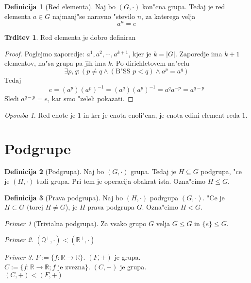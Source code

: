 \documentclass{article}
\theoremstyle{definition}
\newtheorem{definition}{Definicija}[section]
\newtheorem{claim}{Trditev}[section]
\theoremstyle{remark}
\newtheorem*{ex}{Primer}
\newtheorem*{rem}{Opomba}
\newcommand{\Q}{\mathbb{Q}}
\newcommand{\R}{\mathbb{R}}
\begin{document}
	\begin{definition}[Red elementa]
		Naj bo $(G, \cdot)$ kon"cna grupa. Tedaj je red elementa $a \in G$ najmanj"se naravno "stevilo $n$, za katerega velja
		\[ a^n = e \]
	\end{definition}
	\begin{claim}
		Red elementa je dobro definiran
	\end{claim}
	\begin{proof}
		Poglejmo zaporedje: $a^1, a^2, \cdots, a^{k+1}$, kjer je $k=|G|$. Zaporedje ima $k+1$ elementov, na"sa grupa pa jih ima $k$.
		Po dirichletovem na"celu %
		\[\exists p,q: (p \neq q \land (\text{B"SS } p < q) \land a^p = a^q) \]
		Tedaj
		\[ e = (a^p)(a^p)^{-1} = (a^q)(a^p)^{-1} = a^q a^{-p} = a^{q-p} \]
		Sledi $a^{q-p} = e$, kar smo "zeleli pokazati.
	\end{proof}
	\begin{rem}
		Red enote je $1$ in ker je enota enoli"cna, je enota edini element reda $1$.
	\end{rem}
	
	\section{Podgrupe}
	\begin{definition}[Podgrupa]
		Naj bo $(G, \cdot)$ grupa. Tedaj je $H \subseteq G$ podgrupa, "ce je $(H, \cdot)$ tudi grupa. Pri tem je operacija obakrat ista. Ozna"cimo $H \leq G$.
	\end{definition}
	\begin{definition}[Prava podgrupa]
		Naj bo $(H, \cdot)$ podrgupa $(G, \cdot)$. "Ce je $H \subset G \text{ (torej } H \neq G$), je $H$ prava podgrupa $G$. Ozna"cimo $H < G$.
	\end{definition}
	
	\begin{ex}[Trivialna podgrupa]
		Za vsako grupo $G$ velja $G \leq G$ in $\lbrace e \rbrace \leq G$.
	\end{ex}
	
	\begin{ex}
		$(\Q^+, \cdot) < (\R^+, \cdot)$
	\end{ex}
	\begin{ex}
		$F := \lbrace f: \R \rightarrow \R \rbrace$. $(F, +)$ je grupa. \\
		$C := \lbrace f: \R \rightarrow \R ; f \text{ je zvezna}\rbrace$. $(C, +)$ je grupa. \\
		$(C, +) < (F, +)$
	\end{ex}
\end{document}
